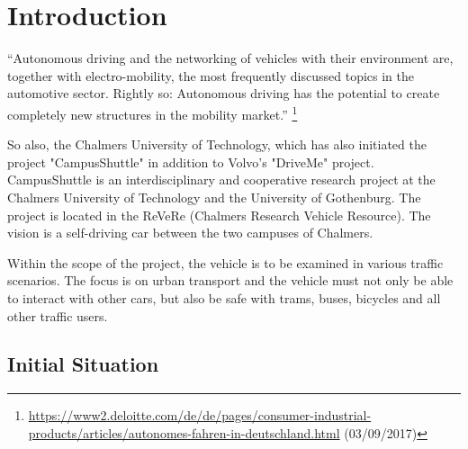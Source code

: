 \chapter{Introduction}
``Autonomous driving and the networking of vehicles with their environment are, together with electro-mobility, the most frequently discussed topics in the automotive sector.
Rightly so: Autonomous driving has the potential to create completely new structures in the mobility market.''
\footnote{\url{https://www2.deloitte.com/de/de/pages/consumer-industrial-products/articles/autonomes-fahren-in-deutschland.html} (03/09/2017)}

So also, the Chalmers University of Technology, which has also initiated the project "CampusShuttle" in addition to Volvo's "DriveMe" project.
CampusShuttle is an interdisciplinary and cooperative research project at the Chalmers University of Technology and the University of Gothenburg.
The project is located in the ReVeRe (Chalmers Research Vehicle Resource). The vision is a self-driving car between the two campuses of Chalmers.

Within the scope of the project, the vehicle is to be examined in various traffic scenarios. The focus is on urban transport and the vehicle must not only be able to interact with other cars, 
but also be safe with trams, buses, bicycles and all other traffic users.

\section{Initial Situation}


